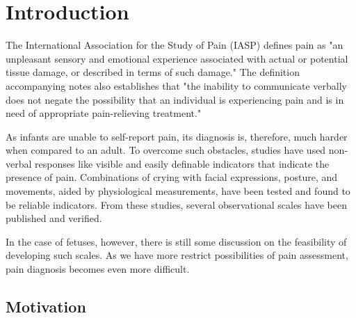 \documentclass[msc]{ppgccufmg}
\begin{document}

\chapter{Introduction}

The International Association for the Study of Pain (IASP) defines pain as "an unpleasant sensory and emotional experience associated with actual or potential tissue damage, or described in terms of such damage." The definition accompanying notes also establishes that "the inability to communicate verbally does not negate the possibility that an individual is experiencing pain and is in need of appropriate pain-relieving treatment." \cite{merskey1994classification}

As infants are unable to self-report pain, its diagnosis is, therefore, much harder when compared to an adult. To overcome such obstacles, studies have used non-verbal responses like visible and easily definable indicators that indicate the presence of pain. Combinations of crying with facial expressions, posture, and movements, aided by physiological measurements, have been tested and found to be reliable indicators. From these studies, several observational scales have been published and verified. 

In the case of fetuses, however, there is still some discussion on the feasibility of developing such scales. As we have more restrict possibilities of pain assessment, pain diagnosis becomes even more difficult.

\section{Motivation}
\end{document}

